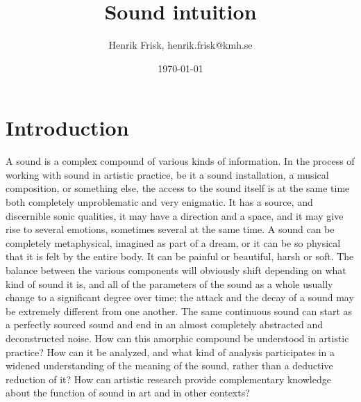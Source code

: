 \documentclass[11pt]{article}
\author{Henrik Frisk, henrik.frisk@kmh.se}
\date{\today}
\title{Sound intuition}
\begin{document}
\maketitle
\section*{Introduction}
\label{sec:orgf219904}
A sound is a complex compound of various kinds of information.
In the process of working with sound in artistic practice, be it a sound installation, a musical composition, or something else, the access to the sound itself is at the same time both completely unproblematic and very enigmatic.
It has a source, and discernible sonic qualities, it may have a direction and a space, and it may give rise to several emotions, sometimes several at the same time.
A sound can be completely metaphysical, imagined as part of a dream, or it can be so physical that it is felt by the entire body.
It can be painful or beautiful, harsh or soft.
The balance between the various components will obviously shift depending on what kind of sound it is, and all of the parameters of the sound as a whole usually change to a significant degree over time: the attack and the decay of a sound may be extremely different from one another.
The same continuous sound can start as a perfectly sourced sound and end in an almost completely abstracted and deconstructed noise.
How can this amorphic compound be understood in artistic practice? How can it be analyzed, and what kind of analysis participates in a widened understanding of the meaning of the sound, rather than a deductive reduction of it? How can artistic research provide complementary knowledge about the function of sound in art and in other contexts?
\end{document}
